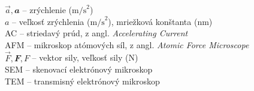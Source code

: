 %
%
\(\vec{a}, \mathbfit{a}\) – zrýchlenie (\(\mathrm{m/s}^2\))\\
\(a\) – veľkosť zrýchlenia (\(\mathrm{m/s}^2\)), mriežková konštanta (nm)\\
AC – striedavý prúd, z angl. \emph{Accelerating Current}\\
AFM – mikroskop atómových síl, z angl. \emph{Atomic Force Microscope}\\
\(\vec{F}, \mathbfit{F}, F\) – vektor sily, veľkosť sily (N)\\
SEM – skenovací elektrónový mikroskop\\
TEM – transmisný elektrónový mikroskop\\
